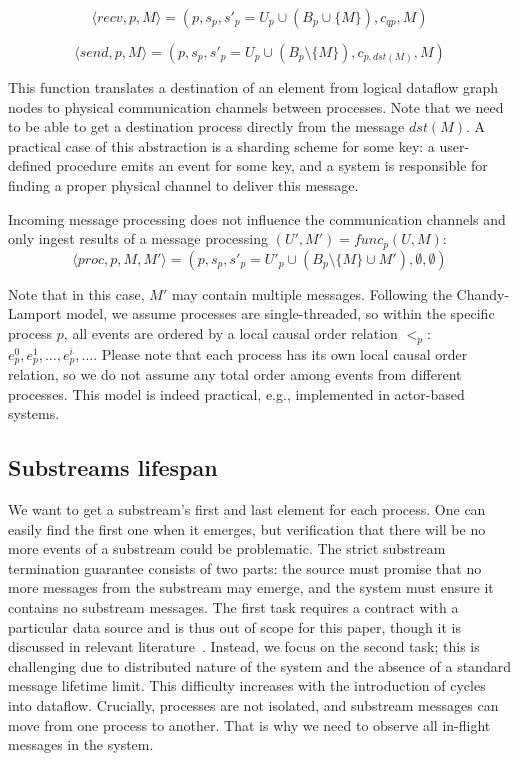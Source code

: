 \begin{equation}
\langle recv, p, M\rangle = (p, s_p, s'_p = U_p \cup \left(B_p \cup \{M\}\right), c_{qp}, M)
\end{equation}

\begin{equation}
\langle send, p, M \rangle = (p, s_p, s'_p = U_p \cup \left(B_p\setminus\{M\}\right), c_{p, dst(M)}, M)
\end{equation}

This function translates a destination of an element from logical dataflow graph nodes to physical communication channels between processes. Note that we need to be able to get a destination process directly from the message $dst(M)$. A practical case of this abstraction is a sharding scheme for some key: a user-defined procedure emits an event for some key, and a system is responsible for finding a proper physical channel to deliver this message.

Incoming message processing does not influence the communication channels and only ingest results of a message processing $(U', M') = func_p(U, M)$:
\begin{equation}
    \langle proc, p, M, M' \rangle = (p, s_p, s'_p = U'_p \cup \left(B_p \setminus \{M\} \cup M' \right) , \emptyset, \emptyset)
\end{equation}

Note that in this case, $M'$ may contain multiple messages. Following the Chandy-Lamport model, we assume processes are single-threaded, so within the specific process $p$, all events are ordered by a local causal order relation $<_p$: $e^{0}_p,e^{1}_p,\ldots,e^{i}_p,\ldots$. Please note that each process has its own local causal order relation, so we do not assume any total order among events from different processes. This model is indeed practical, e.g., implemented in actor-based systems.

\subsection{Substreams lifespan}

We want to get a substream's first and last element for each process. One can easily find the first one when it emerges, but verification that there will be no more events of a substream could be problematic. The strict substream termination guarantee consists of two parts: the source must promise that no more messages from the substream may emerge, and the system must ensure it contains no substream messages. The first task requires a contract with a particular data source and is thus out of scope for this paper, though it is discussed in relevant literature~\cite{awad2019adaptive}. Instead, we focus on the second task; this is challenging due to distributed nature of the system and the absence of a standard message lifetime limit. This difficulty increases with the introduction of cycles into dataflow. Crucially, processes are not isolated, and substream messages can move from one process to another. That is why we need to observe all in-flight messages in the system.

